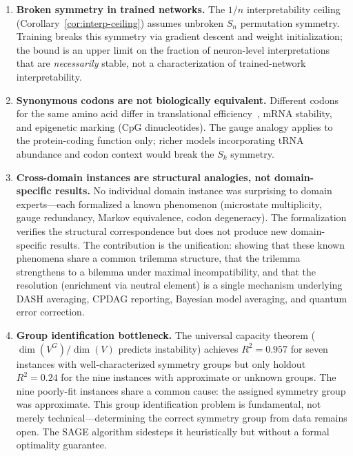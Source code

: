 \documentclass[11pt,a4paper]{article}
\begin{document}
\begin{enumerate}[label=(\arabic*)]
    collapsed.  The contribution is not the proof's depth but the
    axiomatic framework---tightness (each pair achievable), necessity
    (biconditional with Rashomon, machine-checked for
    inequality-incompatibility; sufficiency plus the fully-specified
    converse in general), and the quantitative corollaries
    (invariance counting, capacity theorem) that follow from the framework but not
    from any simpler observation about non-injectivity.
  \item \textbf{Broken symmetry in trained networks.}  The $1/n$
    interpretability ceiling (Corollary~\ref{cor:interp-ceiling}) assumes
    unbroken $S_n$ permutation symmetry.  Training breaks this symmetry
    via gradient descent and weight initialization; the bound is an upper
    limit on the fraction of neuron-level interpretations that are
    \emph{necessarily} stable, not a characterization of trained-network
    interpretability.
  \item \textbf{Synonymous codons are not biologically equivalent.}
    Different codons for the same amino acid differ in translational
    efficiency~\citep{ikemura1985codon}, mRNA
    stability, and epigenetic marking (CpG dinucleotides).  The gauge
    analogy applies to the protein-coding function only; richer models
    incorporating tRNA abundance and codon context would break the
    $S_k$ symmetry.
  \item \textbf{Cross-domain instances are structural analogies, not domain-specific results.}  No individual domain instance was surprising to domain experts---each formalized a known phenomenon (microstate multiplicity, gauge redundancy, Markov equivalence, codon degeneracy).  The formalization verifies the structural correspondence but does not produce new domain-specific results.  The contribution is the unification: showing that these known phenomena share a common trilemma structure, that the trilemma strengthens to a bilemma under maximal incompatibility, and that the resolution (enrichment via neutral element) is a single mechanism underlying DASH averaging, CPDAG reporting, Bayesian model averaging, and quantum error correction.
  \item \textbf{Group identification bottleneck.}  The universal capacity theorem ($\dim(V^G)/\dim(V)$ predicts instability) achieves $R^2 = 0.957$ for seven instances with well-characterized symmetry groups but only holdout $R^2 = 0.24$ for the nine instances with approximate or unknown groups.  The nine poorly-fit instances share a common cause: the assigned symmetry group was approximate.  This group identification problem is fundamental, not merely technical---determining the correct symmetry group from data remains open.  The SAGE algorithm sidesteps it heuristically but without a formal optimality guarantee.


\end{enumerate}
\end{document}
